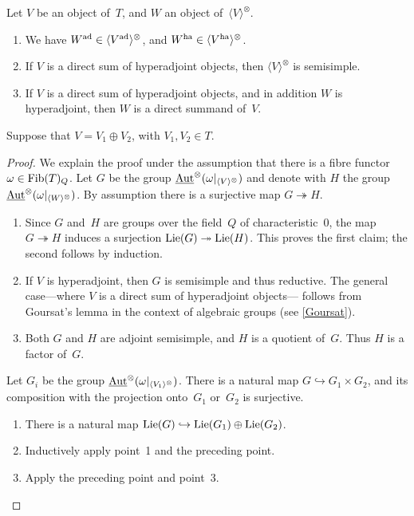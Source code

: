 \documentclass[10pt,twoside,leqno]{article}
\numberwithin{equation}{subsection}
\newcommand{\into}{\hookrightarrow}
\newcommand{\onto}{\twoheadrightarrow}
\newcommand{\Aut}{\textnormal{Aut}}
\newcommand{\iAut}{\underline{\Aut}}
\newcommand{\ZZ}{\mathbb{Z}}
\newcommand{\Lie}{\textnormal{Lie}}
\newcommand{\ad}{\textnormal{ad}}
\newcommand{\ha}{\textnormal{ha}}
\newcommand{\Fib}{\textnormal{Fib}}
\newcommand{\Tangen}[1]{\langle #1 \rangle^{\otimes}}
\begin{document}
\begin{lemma} %
 \label{ha-props}
 Let $V$ be an object of~$T$, and $W$ an object of~$\Tangen{V}$.
 \begin{enumerate}
  \item We have $W^\ad \in \Tangen{V^\ad}$, and $W^\ha \in \Tangen{V^\ha}$.
  \item If $V$ is a direct sum of hyperadjoint objects,
   then $\Tangen{V}$ is semisimple.
  \item If $V$ is a direct sum of hyperadjoint objects,
   and in addition $W$ is hyperadjoint,
   then $W$ is a direct summand of~$V$.
 \end{enumerate}
  Suppose that $V = V_1 \oplus V_2$, with $V_1,V_2 \in T$.
 \begin{proof}
  We explain the proof under the assumption
  that there is a fibre functor $\omega \in \Fib(T)_Q$.
  Let $G$ be the group $\iAut^\otimes(\omega|_{\Tangen{V}})$
  and denote with $H$ the group $\iAut^\otimes(\omega|_{\Tangen{W}})$.
  By assumption there is a surjective map $G \onto H$.
  \begin{enumerate}
   \item Since $G$ and~$H$ are groups over the field~$Q$ of characteristic~$0$,
    the map $G \onto H$ induces a surjection $\Lie(G) \onto \Lie(H)$.
    This proves the first claim; the second follows by induction.
   \item If $V$ is hyperadjoint, then $G$ is semisimple and thus reductive.
    The general case---where $V$ is a direct sum of hyperadjoint objects---%
    follows from Goursat's lemma in the context of algebraic groups
    (see \cref{Goursat}).
   \item Both $G$ and $H$ are adjoint semisimple, and $H$ is a quotient of~$G$.
    Thus $H$ is a factor of~$G$.
  \end{enumerate}
  Let $G_i$ be the group $\iAut^\otimes(\omega|_{\Tangen{V_1}})$.
  There is a natural map $G \into G_1 \times G_2$,
  and its composition with the projection onto~$G_1$ or~$G_2$ is surjective.
  \begin{enumerate}[resume]
   \item There is a natural map $\Lie(G) \into \Lie(G_1) \oplus \Lie(G_2)$.
   \item Inductively apply point~1 and the preceding point.
   \item Apply the preceding point and point~3.
  \end{enumerate}
 \end{proof}
\end{lemma}
\end{document}
